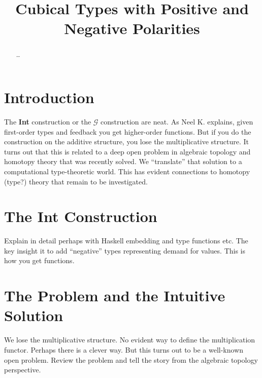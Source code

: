 \documentclass[authoryear,preprint]{sigplanconf}
\begin{document}
\lstset{breaklines=true, breakatwhitespace=true}
\lstset{numbers=none, numbersep=5pt, stepnumber=2, numberstyle=\scriptsize}
\lstset{rangeprefix=/*!\ , rangesuffix=\ !*\/, includerangemarker=false}

\title{Cubical Types with Positive and Negative Polarities}
\authorinfo{}{}{}
\maketitle

\begin{abstract}
\ldots
\end{abstract}

\section{Introduction}

The \textbf{Int} construction or the $\mathcal{G}$ construction are neat. As
Neel K. explains, given first-order types and feedback you get higher-order
functions. But if you do the construction on the additive structure, you lose
the multiplicative structure. It turns out that this is related to a deep
open problem in algebraic topology and homotopy theory that was recently
solved. We ``translate'' that solution to a computational type-theoretic
world. This has evident connections to homotopy (type?) theory that remain to
be investigated.

\section{The \textbf{Int} Construction} 

Explain in detail perhaps with Haskell embedding and type functions etc. The
key insight it to add ``negative'' types representing demand for values. This
is how you get functions.

\section{The Problem and the Intuitive Solution}

We lose the multiplicative structure. No evident way to define the
multiplication functor. Perhaps there is a clever way. But this turns out to
be a well-known open problem. Review the problem and tell the story from the
algebraic topology perspective.
\end{document}
